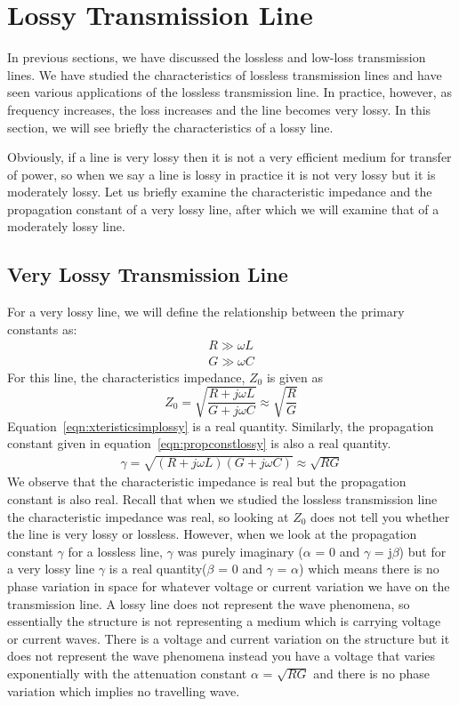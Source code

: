 \section{Lossy Transmission Line}\label{lec:lec13}
In previous sections, we have discussed the lossless and low-loss transmission lines. We have studied the characteristics of lossless transmission lines and have seen various applications of the lossless transmission line. In practice, however, as frequency increases, the loss increases and the line becomes very lossy. In this section, we will see briefly the characteristics of a lossy line.

Obviously, if a line is very lossy then it is not a very efficient medium for transfer of power, so when we say a line is lossy in practice it is not very lossy but it is moderately lossy. Let us briefly examine the characteristic impedance and the propagation constant of a very lossy line, after which we will examine that of a moderately lossy line.

\subsection{Very Lossy Transmission Line}
For a very lossy line, we will define the relationship between the primary constants as:
\begin{align*}
R\gg\omega L
\\G\gg\omega C
\end{align*}
For this line, the characteristics impedance, $Z_0$ is given as
\begin{dmath}
Z_0 = \sqrt{\frac{R + j\omega L}{G + j\omega C}} \approx \sqrt{\frac{R}{G}}
\label{eqn:xteristicsimplossy}
\end{dmath}
Equation~\eqref{eqn:xteristicsimplossy} is a real quantity. Similarly, the propagation constant given in equation~\eqref{eqn:propconstlossy} is also a real quantity.
\begin{align}
\gamma = \sqrt{(R + j\omega L)(G + j\omega C)} \approx \sqrt{RG}
\label{eqn:propconstlossy}
\end{align}
We observe that the characteristic impedance is real but the propagation constant is also real. Recall that when we studied the lossless transmission line the characteristic impedance was real, so looking at $Z_0$ does not tell you whether the line is very lossy or lossless. However, when we look at the propagation constant $\gamma$ for a lossless line, $\gamma$ was purely imaginary ($\alpha$ = 0 and $\gamma$ = j$\beta$) but for a very lossy line $\gamma$ is a real quantity($\beta$ = 0 and $\gamma$ = $\alpha$) which means there is no phase variation in space for whatever voltage or current variation we have on the transmission line. A lossy line does not represent the wave phenomena, so essentially the structure is not representing a medium which is carrying voltage or current waves. There is a voltage and current variation on the structure but it does not represent the wave phenomena instead you have a voltage that varies exponentially with the attenuation constant $\alpha$ = $\sqrt{RG}$ and there is no phase variation which implies no travelling wave.

